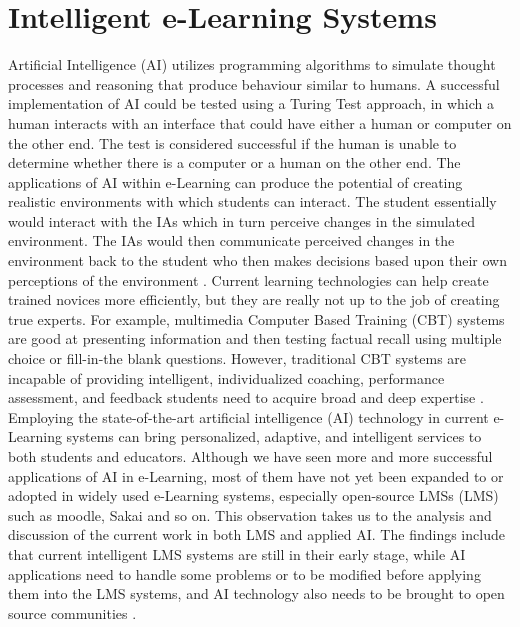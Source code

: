 \documentclass[12pt,a4paper,final,twoside,onecolumn,titlepage]{book}
\begin{document}
\section{Intelligent e-Learning Systems}
Artificial Intelligence (AI) utilizes programming algorithms to simulate thought processes and reasoning that produce behaviour similar to humans. A successful implementation of AI could be tested using a Turing Test approach, in which a human interacts with an interface that could have either a human or computer on the other end. The test is considered successful if the human is unable to determine whether there is a computer or a human on the other end. The applications of AI within e-Learning can produce the potential of creating realistic environments with which students can interact. The student essentially would interact with the \gls{IA}s which in turn perceive changes in the simulated environment. The \gls{IA}s would then communicate perceived changes in the environment back to the student who then makes decisions based upon their own perceptions of the environment \cite{R27}. 
Current learning technologies can help create trained novices more efficiently, but they are really not up to the job of creating true experts. For example, multimedia Computer Based Training (CBT) systems are good at presenting information and then testing factual recall using multiple choice or fill-in-the blank questions. However, traditional CBT systems are incapable of providing intelligent, individualized coaching, performance assessment, and feedback students need to acquire broad and deep expertise \cite{R08}.
Employing the state-of-the-art artificial intelligence (AI) technology in current e-Learning systems can bring personalized, adaptive, and intelligent services to both students and educators. Although we have seen more and more successful applications of AI in e-Learning, most of them have not yet been expanded to or adopted in widely used e-Learning systems, especially open-source \gls{LMS}s (\gls{LMS}) such as \gls{moodle}, Sakai and so on. This observation takes us to the analysis and discussion of the current work in both \gls{LMS} and applied AI. The findings include that current intelligent \gls{LMS} systems are still in their early stage, while AI applications need to handle some problems or to be modified before applying them into the \gls{LMS} systems, and AI technology also needs to be brought to open source communities \cite{R28}.
\end{document}
